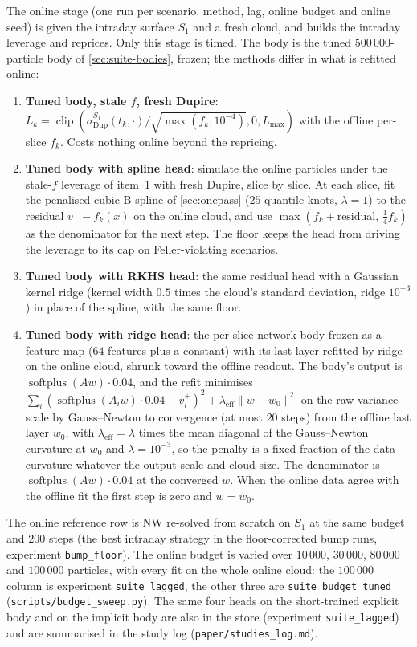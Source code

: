 \documentclass[11pt,a4paper]{article}
\newcommand{\sigDup}{\sigma_{\mathrm{Dup}}}
\newcommand{\Lev}{L}
\newcommand{\Lmax}{L_{\max}}
\newcommand{\code}[1]{\texttt{#1}}
\begin{document}
The online stage (one run per scenario, method, lag, online budget and online seed) is given the intraday surface $S_1$ and a fresh cloud, and builds the intraday leverage and reprices. Only this stage is timed. The body is the tuned $500\,000$-particle body of \cref{sec:suite-bodies}, frozen; the methods differ in what is refitted online:
\begin{enumerate}
\item \textbf{Tuned body, stale $f$, fresh Dupire}: $\Lev_k=\operatorname{clip}(\sigDup^{S_1}(t_k,\cdot)/\sqrt{\max(f_k,10^{-4})},0,\Lmax)$ with the offline per-slice $f_k$. Costs nothing online beyond the repricing.
\item \textbf{Tuned body with spline head}: simulate the online particles under the stale-$f$ leverage of item~1 with fresh Dupire, slice by slice. At each slice, fit the penalised cubic B-spline of \cref{sec:onepass} ($25$ quantile knots, $\lambda=1$) to the residual $v^+-f_k(x)$ on the online cloud, and use $\max(f_k+\text{residual},\,\tfrac14 f_k)$ as the denominator for the next step. The floor keeps the head from driving the leverage to its cap on Feller-violating scenarios.
\item \textbf{Tuned body with RKHS head}: the same residual head with a Gaussian kernel ridge (kernel width $0.5$ times the cloud's standard deviation, ridge $10^{-3}$) in place of the spline, with the same floor.
\item \textbf{Tuned body with ridge head}: the per-slice network body frozen as a feature map ($64$ features plus a constant) with its last layer refitted by ridge on the online cloud, shrunk toward the offline readout. The body's output is $\operatorname{softplus}(A w)\cdot 0.04$, and the refit minimises $\sum_i(\operatorname{softplus}(A_i w)\cdot 0.04-v_i^+)^2+\lambda_{\mathrm{eff}}\|w-w_0\|^2$ on the raw variance scale by Gauss--Newton to convergence (at most $20$ steps) from the offline last layer $w_0$, with $\lambda_{\mathrm{eff}}=\lambda$ times the mean diagonal of the Gauss--Newton curvature at $w_0$ and $\lambda=10^{-3}$, so the penalty is a fixed fraction of the data curvature whatever the output scale and cloud size. The denominator is $\operatorname{softplus}(A w)\cdot0.04$ at the converged $w$. When the online data agree with the offline fit the first step is zero and $w=w_0$.
\end{enumerate}
The online reference row is NW re-solved from scratch on $S_1$ at the same budget and $200$ steps (the best intraday strategy in the floor-corrected bump runs, experiment \code{bump\_floor}). The online budget is varied over $10\,000$, $30\,000$, $80\,000$ and $100\,000$ particles, with every fit on the whole online cloud: the $100\,000$ column is experiment \code{suite\_lagged}, the other three are \code{suite\_budget\_tuned} (\code{scripts/budget\_sweep.py}). The same four heads on the short-trained explicit body and on the implicit body are also in the store (experiment \code{suite\_lagged}) and are summarised in the study log (\code{paper/studies\_log.md}).
\end{document}

